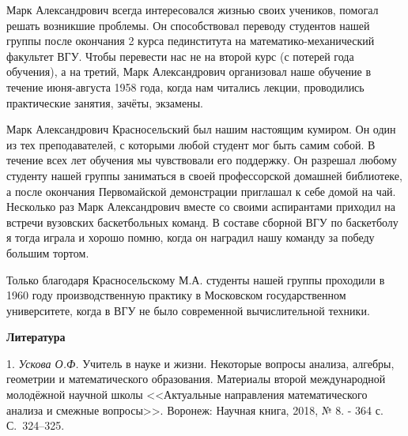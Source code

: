 Марк Александрович всегда интересовался жизнью своих учеников, помогал решать возникшие проблемы. Он способствовал
переводу студентов нашей группы после окончания 2 курса пединститута на математико-механический факультет ВГУ. Чтобы
перевести нас не на второй курс (с потерей года обучения), а на третий, Марк Александрович организовал наше обучение
в течение июня-августа 1958 года, когда нам читались лекции, проводились практические занятия, зачёты, экзамены.

Марк Александрович Красносельский был нашим настоящим кумиром. Он один из тех преподавателей, с которыми любой студент
мог быть самим собой. В течение всех лет обучения мы чувствовали его поддержку. Он разрешал любому студенту нашей
группы заниматься в своей профессорской домашней библиотеке, а после окончания Первомайской демонстрации приглашал
к себе домой на чай. Несколько раз Марк Александрович вместе со своими аспирантами приходил на встречи вузовских
баскетбольных команд. В составе сборной ВГУ по баскетболу я тогда играла и хорошо помню, когда он наградил нашу
команду за победу большим тортом.

Только благодаря Красносельскому М.А. студенты нашей группы проходили в 1960 году производственную практику в Московском
государственном университете, когда в ВГУ не было современной вычислительной техники.


\smallskip \centerline {\bf Литература} \nopagebreak

1. {\it Ускова О.Ф.} Учитель в науке и жизни. Некоторые вопросы анализа, алгебры, геометрии и математического образования.
Материалы второй международной молодёжной научной школы <<Актуальные направления математического анализа и смежные вопросы>>.
Воронеж: Научная книга, 2018, № 8. - 364 с. С.~324--325.

